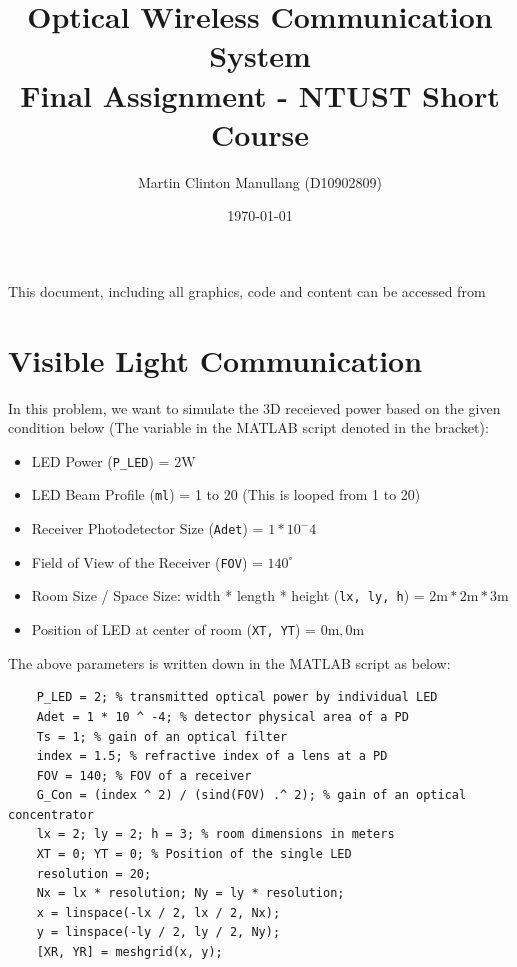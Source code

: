 \documentclass[12pt]{article}
\begin{document}
\title{Optical Wireless Communication System \\ \large{Final Assignment - NTUST Short Course}}
\author{Martin Clinton Manullang (D10902809)}
\date{\today}
\maketitle

This document, including all graphics, code and content can be accessed from 

\section{Visible Light Communication}
	In this problem, we want to simulate the 3D receieved power based on the given condition below (The variable in the MATLAB script denoted in the bracket):
    \begin{itemize}
        \item LED Power (\texttt{P\_LED}) = $2 \text{W}$
        \item LED Beam Profile (\texttt{ml}) = 1 to 20 (This is looped from 1 to 20)
        \item Receiver Photodetector Size (\texttt{Adet}) = $1 * 10^-{4}$
        \item Field of View of the Receiver (\texttt{FOV}) = $140^\circ$
        \item Room Size / Space Size: width * length * height (\texttt{lx, ly, h}) = $2 \text{m} * 2 \text{m} * 3 \text{m}$
        \item Position of LED at center of room (\texttt{XT, YT}) = $0 \text{m} , 0 \text{m}$
    \end{itemize}

    The above parameters is written down in the MATLAB script as below:

    \begin{lstlisting}
    P_LED = 2; % transmitted optical power by individual LED
    Adet = 1 * 10 ^ -4; % detector physical area of a PD
    Ts = 1; % gain of an optical filter
    index = 1.5; % refractive index of a lens at a PD
    FOV = 140; % FOV of a receiver
    G_Con = (index ^ 2) / (sind(FOV) .^ 2); % gain of an optical concentrator
    lx = 2; ly = 2; h = 3; % room dimensions in meters
    XT = 0; YT = 0; % Position of the single LED
    resolution = 20;
    Nx = lx * resolution; Ny = ly * resolution;
    x = linspace(-lx / 2, lx / 2, Nx);
    y = linspace(-ly / 2, ly / 2, Ny);
    [XR, YR] = meshgrid(x, y);
    \end{lstlisting}
\end{document}

